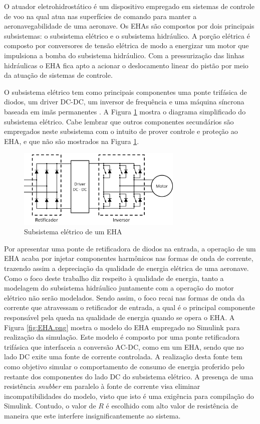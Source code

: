 O atuador eletrohidrostático é um dispositivo empregado em sistemas de controle de voo na qual atua nas superfícies de comando para manter a aeronavegabilidade de uma aeronave. Os EHAs são compostos por dois principais subsistemas: o subsistema elétrico e o subsistema hidráulico. A porção elétrica é composto por conversores de tensão elétrica de modo a energizar um motor que impulsiona a bomba do subsistema hidráulico. Com a pressurização das linhas hidráulicas o EHA fica apto a acionar o deslocamento linear do pistão por meio da atuação de sistemas de controle.

O subsistema elétrico tem como principais componentes uma ponte trifásica de diodos, um driver DC-DC, um inversor de frequência e uma máquina síncrona baseada em imãs permanentes \cite{Dinca2014}. A Figura \ref{fig:EHA_elec.png} mostra o diagrama simplificado do subsistema elétrico. Cabe lembrar que outros componentes secundários são empregados neste subsistema com o intuito de prover controle e proteção ao EHA, e que não são mostrados na Figura \ref{fig:EHA_elec.png}.

\begin{figure}[!htb] %
	\centering
	\includegraphics[width=0.7\textwidth]{Cap4/Figuras/EHA_elec.png}
	\caption{Subsistema elétrico de um EHA}
	\label{fig:EHA_elec.png}
\end{figure}  

Por apresentar uma ponte de retificadora de diodos na entrada, a operação de um EHA acaba por injetar componentes harmônicos nas formas de onda de corrente, trazendo assim a depreciação da qualidade de energia elétrica de uma aeronave. Como o foco deste trabalho diz respeito à qualidade de energia, tanto a modelagem do subsistema hidráulico juntamente com a operação do motor elétrico não serão modelados. Sendo assim, o foco recai nas formas de onda da corrente que atravessam o retificador de entrada, a qual é o principal componente responsável pela queda na qualidade de energia quando se opera o EHA. A Figura \ref{fig:EHA.png} mostra o modelo do EHA empregado no Simulink para realização da simulação. Este modelo é composto por uma ponte retificadora trifásica que interfaceia a conversão AC-DC, como em um EHA, sendo que no lado DC exite uma fonte de corrente controlada. A realização desta fonte tem como objetivo simular o comportamento de consumo de energia proferido pelo restante dos componentes do lado DC do subsistema elétrico. A presença de uma resistência \textit{snubber} em paralelo à fonte de corrente visa eliminar incompatibilidades do modelo, visto que isto é uma exigência para compilação do Simulink. Contudo, o valor de $R$ é escolhido com alto valor de resistência de maneira que este interfere insignificantemente ao sistema.

